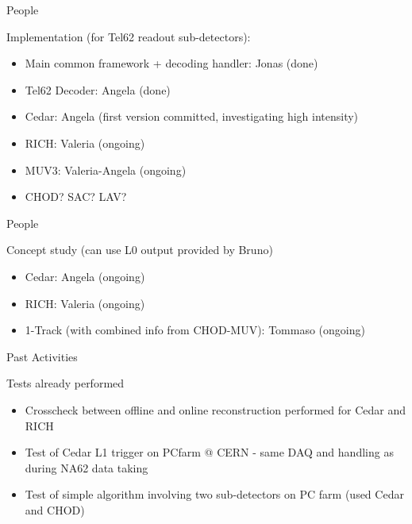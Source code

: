 \begin{frame}{People}{}
	\begin{block}{Implementation (for Tel62 readout sub-detectors):}
		\begin{itemize}
		  \item Main common framework + decoding handler: Jonas (done)
		  \item Tel62 Decoder: Angela (done)
		  \item Cedar: Angela (first version committed, investigating high intensity)
		  \item RICH: Valeria (ongoing)
		  \item MUV3: Valeria-Angela (ongoing)
		  \item CHOD? SAC? LAV?
		\end{itemize}
	\end{block}
\end{frame}

\begin{frame}{People}{}
	\begin{block}{Concept study (can use L0 output provided by Bruno)}
		\begin{itemize}
		  \item Cedar: Angela (ongoing)
		  \item RICH: Valeria (ongoing)
		  \item 1-Track (with combined info from CHOD-MUV): Tommaso (ongoing)
		\end{itemize}
	\end{block}
\end{frame}

\begin{frame}{Past Activities}{}
	\begin{block}{Tests already performed}
		\begin{itemize}
		  \item Crosscheck between offline and online reconstruction performed for
		  Cedar and RICH
		  \item Test of Cedar L1 trigger on PCfarm @ CERN - same DAQ and handling as during NA62
data taking
		  \item Test of simple algorithm involving two sub-detectors on PC farm (used Cedar and CHOD)
		\end{itemize}
	\end{block}
\end{frame}

